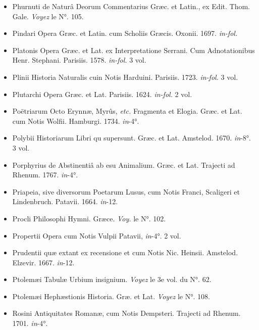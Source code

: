 \documentclass[a4paper, 11pt, oneside, polutonikogreek, french]{article}
\begin{document}
\begin{itemize}
    \item Phurnuti de Naturâ Deorum Commentarius Græc. et Latin., ex Edit. Thom. Gale. \emph{Voyez} le N°. 105.

    \item Pindari Opera Græc. et Latin. cum Scholiis Græcis. Oxonii. 1697. \emph{in-fol.}

    \item Platonis Opera Græc. et Lat. ex Interpretatione Serrani. Cum Adnotationibus Henr. Stephani. Parisiis. 1578. \emph{in-fol.} 3 vol.

    \item Plinii Historia Naturalis cuin Notis Harduini. Parisiis. 1723. \emph{in-fol.} 3 vol.

    \item Plutarchi Opera Græc. et Lat. Parisiis. 1624. \emph{in-fol.} 2 vol.

    \item Poëtriarum Octo Erynnæ, Myrûs, \emph{etc.} Fragmenta et Elogia. Græc. et Lat. cum Notis Wolfii. Hamburgi. 1734. \emph{in}-4°.

    \item Polybii Historiarum Libri qu supersunt. Græc. et Lat. Amstelod. 1670. \emph{in}-8°. 3 vol.

    \item Porphyrius de Abstinentiâ ab esu Animalium. Græc. et Lat. Trajecti ad Rhenum. 1767. \emph{in}-4°.

    \item Priapeia, sive diversorum Poetarum Lusus, cum Notis Franci, Scaligeri et Lindenbruch. Patavii. 1664. \emph{in}-12.

    \item Procli Philosophi Hymni. Græce. \emph{Voy.} le N°. 102.

    \item Propertii Opera cum Notis Vulpii Patavii, \emph{in}-4°. 2 vol.

    \item Prudentii quæ extant ex recensione et cum Notis Nic. Heinsii. Amstelod. Elzevir. 1667. \emph{in}-12.

    \item Ptolemæi Tabulæ Urbium insignium. \emph{Voyez} le 3e vol. du N°. 62.

    \item Ptolemæi Hephæstionis Historia. Græ. et Lat. \emph{Voyez} le N°. 108.

    \item Rosini Antiquitates Romanæ, cum Notis Dempsteri. Trajecti ad Rhenum. 1701. \emph{in}-4°. 


\end{itemize}
\end{document}
